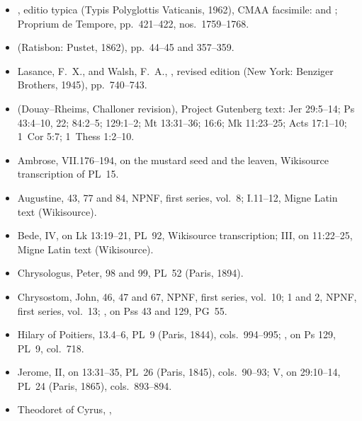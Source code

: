 {\footnotesize
\begin{itemize}[leftmargin=1.2em,itemsep=.15em]
\item {}, editio typica (Typis
Polyglottis Vaticanis, 1962), CMAA facsimile:  and
; Proprium de Tempore,
pp.~421--422, nos.~1759--1768.
\item {} (Ratisbon: Pustet, 1862), pp.~44--45 and
357--359.
\item Lasance, F.~X., and Walsh, F.~A., , revised edition (New York: Benziger Brothers, 1945), pp.~740--743.
\item {} (Douay--Rheims,
Challoner revision), Project Gutenberg text: Jer 29:5--14; Ps 43:4--10, 22;
84:2--5; 129:1--2; Mt 13:31--36; 16:6; Mk 11:23--25; Acts 17:1--10;
1~Cor 5:7; 1~Thess 1:2--10.
\item Ambrose,  VII.176--194, on the
mustard seed and the leaven, Wikisource transcription of PL~15.
\item Augustine,  43, 77 and 84, NPNF, first
series, vol.~8;  I.11--12, Migne Latin text
(Wikisource).
\item Bede,  IV, on Lk 13:19--21, PL~92,
Wikisource transcription;  III, on
11:22--25, Migne Latin text (Wikisource).
\item Chrysologus, Peter,  98 and 99, PL~52 (Paris, 1894).
\item Chrysostom, John,  46, 47 and 67, NPNF, first
series, vol.~10;  1 and 2, NPNF, first
series, vol.~13; , on Pss 43 and 129, PG~55.
\item Hilary of Poitiers,  13.4--6,
PL~9 (Paris, 1844), cols.~994--995; , on Ps 129,
PL~9, col.~718.
\item Jerome,  II, on 13:31--35, PL~26 (Paris,
1845), cols.~90--93;  V, on 29:10--14, PL~24 (Paris,
1865), cols.~893--894.
\item Theodoret of Cyrus, ,

\end{itemize}}

